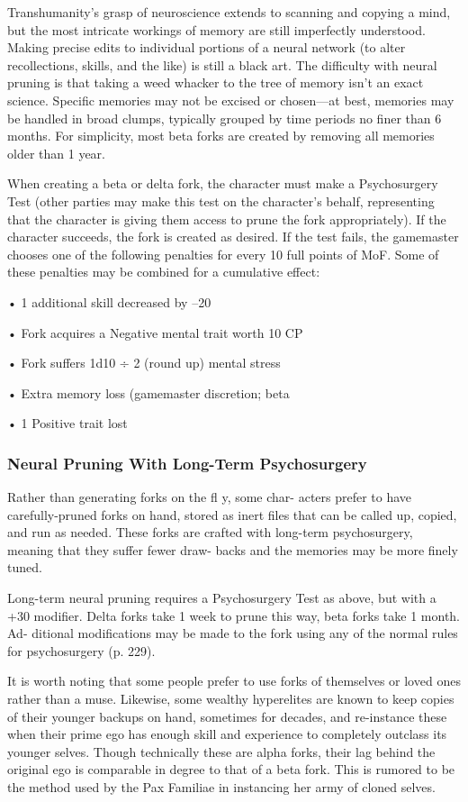 Transhumanity's grasp of neuroscience extends to 
scanning and copying a mind, but the most intricate 
workings of memory are still imperfectly understood. 
Making precise edits to individual portions of a neural 
network (to alter recollections, skills, and the like) is 
still a black art. The difficulty with neural pruning is 
that taking a weed whacker to the tree of memory 
isn't an exact science. Specific memories may not be 
excised or chosen—at best, memories may be handled 
in broad clumps, typically grouped by time periods no 
finer than 6 months. For simplicity, most beta forks are 
created by removing all memories older than 1 year.

When creating a beta or delta fork, the character 
must make a Psychosurgery Test (other parties may 
make this test on the character's behalf, representing 
that the character is giving them access to prune the 
fork appropriately). If the character succeeds, the fork 
is created as desired. If the test fails, the gamemaster 
chooses one of the following penalties for every 10 
full points of MoF. Some of these penalties may be 
combined for a cumulative effect:

•  1 additional skill decreased by –20

•  Fork acquires a Negative mental trait worth 10 CP

•  Fork suffers 1d10 ÷ 2 (round up) mental stress

•  Extra memory loss (gamemaster discretion; beta 

•  1 Positive trait lost

\subsubsection{Neural Pruning With Long-Term Psychosurgery}

Rather than generating forks on the fl y, some char-
acters prefer to have carefully-pruned forks on hand, 
stored as inert files that can be called up, copied, and 
run as needed. These forks are crafted with long-term 
psychosurgery, meaning that they suffer fewer draw-
backs and the memories may be more finely tuned.

Long-term neural pruning requires a Psychosurgery 
Test as above, but with a +30 modifier. Delta forks take 
1 week to prune this way, beta forks take 1 month. Ad-
ditional modifications may be made to the fork using 
any of the normal rules for psychosurgery (p. 229).

It is worth noting that some people prefer to use 
forks of themselves or loved ones rather than a muse. 
Likewise, some wealthy hyperelites are known to keep 
copies of their younger backups on hand, sometimes 
for decades, and re-instance these when their prime 
ego has enough skill and experience to completely 
outclass its younger selves. Though technically these 
are alpha forks, their lag behind the original ego is 
comparable in degree to that of a beta fork. This is 
rumored to be the method used by the Pax Familiae 
in instancing her army of cloned selves.

